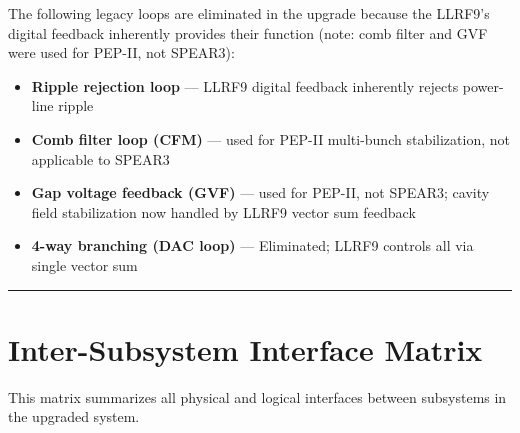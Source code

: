 The following legacy loops are eliminated in the upgrade because the LLRF9's digital feedback inherently provides their function (note: comb filter and GVF were used for PEP-II, not SPEAR3):

\begin{itemize}
\tightlist
\item
  \textbf{Ripple rejection loop} --- LLRF9 digital feedback inherently rejects power-line ripple
\item
  \textbf{Comb filter loop (CFM)} --- used for PEP-II multi-bunch stabilization, not applicable to SPEAR3
\item
  \textbf{Gap voltage feedback (GVF)} --- used for PEP-II, not SPEAR3; cavity field stabilization now handled by LLRF9 vector sum feedback
\item
  \textbf{4-way branching (DAC loop)} --- Eliminated; LLRF9 controls all via single vector sum
\end{itemize}

\begin{center}\rule{0.5\linewidth}{0.5pt}\end{center}

\section{Inter-Subsystem Interface Matrix}\label{inter-subsystem-interface-matrix}

This matrix summarizes all physical and logical interfaces between subsystems in the upgraded system.

